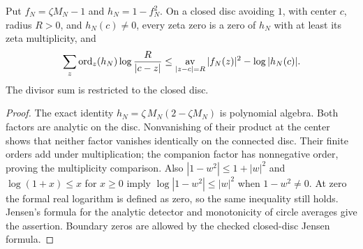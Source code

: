 \begin{lemma}
\label{density:jensen-detector}
\leanok
Put $f_N=\zeta M_N-1$ and $h_N=1-f_N^2$.
On a closed disc avoiding $1$, with center $c$, radius $R>0$, and
$h_N(c)\ne0$, every zeta zero is a zero of $h_N$ with at least its
zeta multiplicity, and
\[
 \sum_z\operatorname{ord}_z(h_N)
       \log\frac R{|c-z|}
 \leq \mathop{\rm av}_{|z-c|=R}|f_N(z)|^2-\log|h_N(c)|.
\]
The divisor sum is restricted to the closed disc.
\end{lemma}
\begin{proof}
The exact identity
$h_N=\zeta\,M_N(2-\zeta M_N)$ is polynomial algebra.
Both factors are analytic on the disc.  Nonvanishing of their
product at the center shows that neither factor vanishes identically
on the connected disc.  Their finite orders add under multiplication;
the companion factor has nonnegative order, proving the multiplicity
comparison.  Also
$|1-w^2|\leq1+|w|^2$ and $\log(1+x)\leq x$ for $x\geq0$ imply
$\log|1-w^2|\leq|w|^2$ when $1-w^2\ne0$.
At zero the formal real logarithm is defined as zero, so the same
inequality still holds.  Jensen's formula for the analytic detector
and monotonicity of circle averages give the assertion.
Boundary zeros are allowed by the checked closed-disc Jensen formula.
\end{proof}

